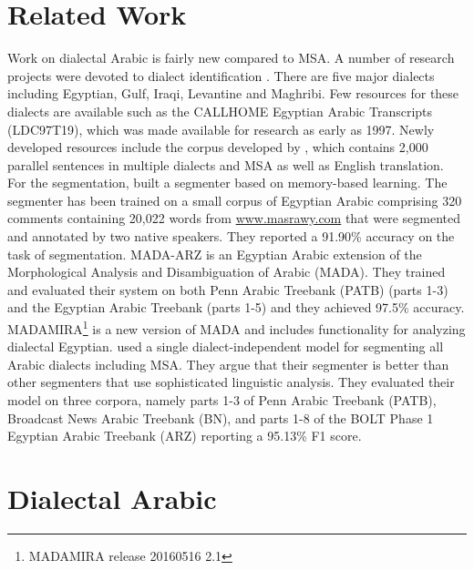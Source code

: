 \documentclass[11pt,letterpaper]{article}
\begin{document}
\section{Related Work}
Work on dialectal Arabic is fairly new compared to MSA. A number of research projects were devoted to dialect identification \cite{Biadsy:2009:SAD:1621774.1621784,Zbib:2012:MTA:2382029.2382037,zaidan2014arabic,eldesouki2016qcri}. There are five major dialects including Egyptian, Gulf, Iraqi, Levantine and Maghribi. Few resources for these dialects are available such as the CALLHOME Egyptian Arabic Transcripts (LDC97T19), which was made available for research as early as 1997. Newly developed resources include the corpus developed by , which contains 2,000 parallel sentences in multiple dialects and MSA as well as English translation.\\
For the segmentation,
 built a segmenter based on memory-based learning. The segmenter has been trained on a small corpus of Egyptian Arabic comprising 320 comments containing 20,022 words from \url{www.masrawy.com} that were segmented and annotated by two native speakers. They reported a 91.90\% accuracy on the task of segmentation. MADA-ARZ \cite{habash2013morphological} is an Egyptian Arabic extension of the Morphological Analysis and Disambiguation of Arabic (MADA). They trained and evaluated their system on both Penn Arabic Treebank (PATB) (parts 1-3) and the Egyptian Arabic Treebank (parts 1-5) \cite{maamouri2014developing} and they achieved 97.5\% accuracy. MADAMIRA\footnote{MADAMIRA release 20160516 2.1} \cite{pasha2014madamira} is a new version of MADA and includes functionality for analyzing dialectal Egyptian.  used a single dialect-independent model for segmenting all Arabic dialects including MSA. They argue that their segmenter is better than other segmenters that use sophisticated linguistic analysis. They evaluated their model on three corpora, namely parts 1-3 of Penn Arabic Treebank (PATB), Broadcast News Arabic Treebank (BN), and parts 1-8 of the BOLT Phase 1 Egyptian Arabic Treebank (ARZ) reporting a 95.13\% F1 score. 
 
\section{Dialectal Arabic}
\end{document}
